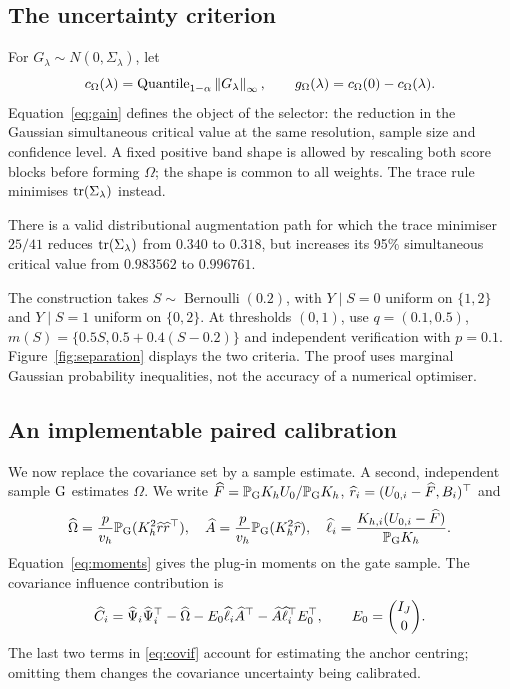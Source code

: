 \subsection{The uncertainty criterion}
For $G_\lambda\sim N(0,\Sigma_\lambda)$, let
\begin{equation}\label{eq:gain}
 c_\Omega(\lambda)=\operatorname{Quantile}_{1-\alpha}\left\lVert G_\lambda\right\rVert_\infty,
 \qquad g_\Omega(\lambda)=c_\Omega(0)-c_\Omega(\lambda).
\end{equation}
Equation~\eqref{eq:gain} defines the object of the selector: the reduction in the Gaussian simultaneous critical value at the same resolution, sample size and confidence level. A fixed positive band shape is allowed by rescaling both score blocks before forming $\Omega$; the shape is common to all weights. The trace rule minimises $\operatorname{tr}(\Sigma_\lambda)$ instead.

\begin{proposition}\label{prop:separation}
There is a valid distributional augmentation path for which the trace minimiser $25/41$ reduces $\operatorname{tr}(\Sigma_\lambda)$ from $0.340$ to $0.318$, but increases its 95\% simultaneous critical value from $0.983562$ to $0.996761$.
\end{proposition}
The construction takes $S\sim\operatorname{Bernoulli}(0.2)$, with $Y\mid S=0$ uniform on $\{1,2\}$ and $Y\mid S=1$ uniform on $\{0,2\}$. At thresholds $(0,1)$, use $q=(0.1,0.5)$, $m(S)=\{0.5S,0.5+0.4(S-0.2)\}$ and independent verification with $p=0.1$. Figure~\ref{fig:separation} displays the two criteria. The proof uses marginal Gaussian probability inequalities, not the accuracy of a numerical optimiser.



\subsection{An implementable paired calibration}
We now replace the covariance set by a sample estimate. A second, independent sample $\mathrm{G}$ estimates $\Omega$. We write $\widehat F=\mathbb P_{\mathrm{G}}K_hU_0/\mathbb P_{\mathrm{G}}K_h$, $\widehat r_i=(U_{0,i}-\widehat F,B_i)^\top$ and
\begin{equation}\label{eq:moments}
 \widehat\Omega=\frac p{v_h}\mathbb P_{\mathrm{G}}(K_h^2\widehat r\widehat r^\top),\quad
 \widehat A=\frac p{v_h}\mathbb P_{\mathrm{G}}(K_h^2\widehat r),\quad
 \widehat\ell_i=\frac{K_{h,i}(U_{0,i}-\widehat F)}{\mathbb P_{\mathrm{G}}K_h}.
\end{equation}
Equation~\eqref{eq:moments} gives the plug-in moments on the gate sample. The covariance influence contribution is
\begin{equation}\label{eq:covif}
 \widehat C_i=\widehat\Psi_i\widehat\Psi_i^\top-\widehat\Omega
       -E_0\widehat\ell_i\widehat A^\top-\widehat A\widehat\ell_i^\top E_0^\top,
       \qquad E_0=\binom{I_J}{0}.
\end{equation}
The last two terms in \eqref{eq:covif} account for estimating the anchor centring; omitting them changes the covariance uncertainty being calibrated.

